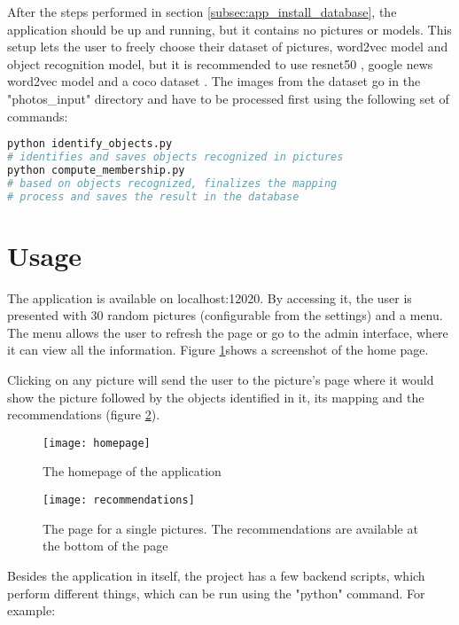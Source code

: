 After the steps performed in section \ref{subsec:app_install_database}, the application should be up and running, but it contains no pictures or models. This setup lets the user to freely choose their dataset of pictures, word2vec model and object recognition model, but it is recommended to use resnet50 \cite{image-ai}, google news word2vec model \cite{word2vec-datasets} and a coco dataset \cite{coco}. The images from the dataset go in the "photos\_input" directory and have to be processed first using the following set of commands:

\begin{lstlisting}[language=Bash]
python identify_objects.py 
# identifies and saves objects recognized in pictures
python compute_membership.py 
# based on objects recognized, finalizes the mapping 
# process and saves the result in the database
\end{lstlisting}

\section{Usage}
\label{sec:app_usage}

The application is available on localhost:12020. By accessing it, the user is presented with 30 random pictures (configurable from the settings) and a menu. The menu allows the user to refresh the page or go to the admin interface, where it can view all the information. Figure \ref{fig:homepage}shows a screenshot of the home page.

Clicking on any picture will send the user to the picture's page where it would show the picture followed by the objects identified in it, its mapping and the recommendations (figure \ref{fig:recommendations}).

\begin{figure}[b!]
\centering
\texttt{[image: homepage]}
\caption{The homepage of the application}
\label{fig:homepage}
\end{figure}

\begin{figure}[b!]
\centering
\texttt{[image: recommendations]}
\caption{The page for a single pictures. The recommendations are available at the bottom of the page}
\label{fig:recommendations}
\end{figure}

Besides the application in itself, the project has a few backend scripts, which perform different things, which can be run using the "python" command. For example:

